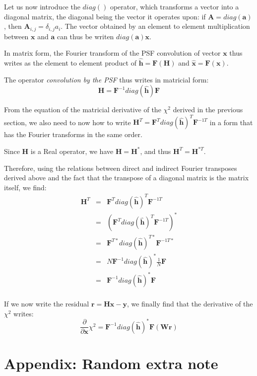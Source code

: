 \documentclass[12pt]{article}
\newcommand{\psf}{\mathbf{H}}
\newcommand{\hhat}{\mathbf{\hat h}}
\newcommand{\x}{\mathbf{x}}
\newcommand{\xhat}{\mathbf{\hat x}}
\newcommand{\y}{\mathbf{y}}
\newcommand{\rvect}{\mathbf{r}}
\newcommand{\W}{\mathbf{W}}
\newcommand{\A}{\mathbf{A}}
\newcommand{\avec}{\mathbf{a}}
\newcommand{\F}{\mathbf{F}}
\newcommand{\ddx}{\frac{\partial}{\partial \mathbf{x}}}
\begin{document}
Let us now introduce the $diag()$ operator, which transforms a vector into a
diagonal matrix, the diagonal being the vector it operates upon: if $\A =
diag(\avec)$, then $\A_{i,j} = \delta_{i,j} a_{i}$. The vector obtained by an
element to element multiplication between $\x$ and $\avec$ can thus be writen
$diag(\avec) \x$.

In matrix form, the Fourier transform of the PSF convolution of vector $\x$ thus
writes as the element to element product of $\hhat = \F(\psf)$ and $\xhat =
\F(\x)$.

The operator \emph{convolution by the PSF} thus writes in matricial form:
\begin{equation}
  \label{eq:11}
  \psf = \F^{-1} diag(\hhat) \F
\end{equation}

From the equation of the matricial derivative of the $\chi^{2}$ derived in the
previous section, we also need to now how to write $\psf^{T} = \F^{T}
diag(\hhat)^{T} \F^{-1T}$ in a form that has the Fourier transforms in the same
order.

Since $\psf$ is a Real operator, we have $\psf = \psf^{*}$, and thus $\psf^{T} =
\psf^{*T}$.

Therefore, using the relations between direct and indirect Fourier transposes
derived above and the fact that the transpose of a diagonal matrix is the matrix
itself, we find:
\begin{eqnarray*}
  \label{eq:12}
  \psf^{T} & = & \F^{T} diag(\hhat)^{T} \F^{-1T}\\
           & = & (\F^{T} diag(\hhat)^{T} \F^{-1T})^{*}\\
           & = & \F^{T*} diag(\hhat)^{T*} \F^{-1T*}\\
           & = & N\F^{-1} diag(\hhat)^{*} \frac{1}{N}\F\\
           & = & \F^{-1} diag(\hhat)^{*} \F\\
\end{eqnarray*}

If we now write the residual $\rvect = \psf \x - \y$, we finally find that the
derivative of the $\chi^{2}$ writes:
\begin{equation}
  \label{eq:13}
  \ddx \chi^{2} = \F^{-1} diag(\hhat)^{*} \F(\W \mathbf{\rvect})
\end{equation}



\section{Appendix: Random extra note}
\end{document}
